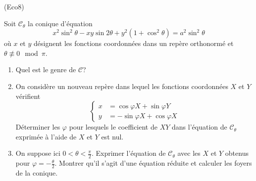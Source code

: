 \begin{tiny}(Eco8)\end{tiny} Soit $\mathcal C_\theta$ la conique d'équation
\begin{displaymath}
 x^2 \sin^2\theta -xy\sin2\theta + y^2(1+\cos^2\theta) = a^2\sin^2\theta
\end{displaymath}
 où $x$ et $y$ désignent les fonctions coordonnées dans un repère orthonormé et $\theta\not \equiv 0 \mod \pi$.
\begin{enumerate}
 \item Quel est le genre de $\mathcal C$?
 \item On considère un nouveau repère dans lequel les fonctions coordonnées $X$ et $Y$ vérifient
\begin{displaymath}
 \left\lbrace 
\begin{aligned}
 x &= \cos \varphi X +\sin \varphi Y \\
 y &= -\sin \varphi X +\cos \varphi X 
\end{aligned}
\right. 
\end{displaymath}
Déterminer les $\varphi$ pour lesquels le coefficient de $XY$ dans l'équation de $\mathcal C_\theta$ exprimée à l'aide de $X$ et $Y$ est nul.
\item On suppose ici $0<\theta<\frac{\pi}{2}$. Exprimer l'équation de $\mathcal C_\theta$ avec les $X$ et $Y$ obtenus pour $\varphi=-\frac{\theta}{2}$. Montrer qu'il s'agit d'une équation réduite et calculer les foyers de la conique.
\end{enumerate}
